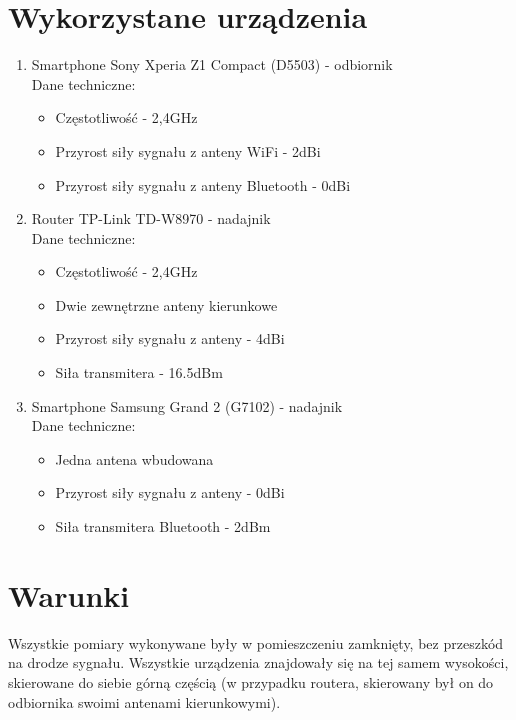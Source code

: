\section{Wykorzystane urządzenia}
\begin{enumerate}
	\item Smartphone Sony Xperia Z1 Compact (D5503) - odbiornik\\				
	Dane techniczne:
	\begin{itemize}
		\item Częstotliwość - 2,4GHz
		\item Przyrost siły sygnału z anteny WiFi - 2dBi
		\item Przyrost siły sygnału z anteny Bluetooth - 0dBi
	\end{itemize}
	\item Router TP-Link TD-W8970 - nadajnik\\
	Dane techniczne:
	\begin{itemize}
		\item Częstotliwość - 2,4GHz
		\item Dwie zewnętrzne anteny kierunkowe
		\item Przyrost siły sygnału z anteny - 4dBi
		\item Siła transmitera - 16.5dBm					
	\end{itemize}
	\item Smartphone Samsung Grand 2 (G7102) - nadajnik\\
	Dane techniczne:
	\begin{itemize}
		\item Jedna antena wbudowana
		\item Przyrost siły sygnału z anteny - 0dBi
		\item Siła transmitera Bluetooth - 2dBm				
	\end{itemize}
\end{enumerate}
\section{Warunki}
Wszystkie pomiary wykonywane były w pomieszczeniu zamknięty, bez przeszkód na drodze sygnału. Wszystkie urządzenia znajdowały się na tej samem wysokości, skierowane do siebie górną częścią (w przypadku routera, skierowany był on do odbiornika swoimi antenami kierunkowymi).
